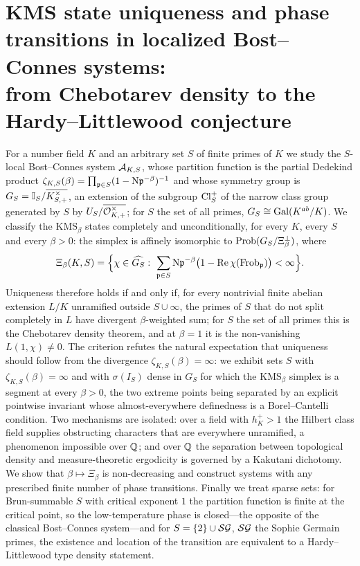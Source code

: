 \chapter[KMS uniqueness in localized Bost--Connes systems]{KMS state uniqueness and phase transitions in localized Bost--Connes systems:\\ from Chebotarev density to the Hardy--Littlewood conjecture}\label{ch:Main}
\begin{summary}
For a number field $K$ and an arbitrary set $S$ of finite primes of $K$ we
study the $S$-local Bost--Connes system $\mathcal{A}_{K,S}$, whose partition function
is the partial Dedekind product $\zeta_{K,S}(\beta)=\prod_{\mathfrak{p}\in S}(1-\mathrm{N}\mathfrak{p}^{-\beta})^{-1}$
and whose symmetry group is $G_S=\mathbb{I}_S/\overline{K^\times_{S,+}}$, an
extension of the subgroup $\operatorname{Cl}^+_S$ of the narrow class group generated by $S$
by $U_S/\overline{\mathcal{O}^\times_{K,+}}$; for $S$ the set of all primes,
$G_S\cong\operatorname{Gal}(K^{ab}/K)$. We classify the $\mathrm{KMS}_\beta$ states
completely and unconditionally, for every $K$, every $S$ and every $\beta>0$:
the simplex is affinely isomorphic to $\mathrm{Prob}(G_S/\Xi_\beta^\perp)$, where
\[
\Xi_\beta(K,S)=\Bigl\{\chi\in\widehat{G_S}:\ \sum_{\pp\in S}\Ns\pp^{-\beta}\bigl(1-\operatorname{Re}\chi(\Frob_\pp)\bigr)<\infty\Bigr\}.
\]
Uniqueness therefore holds if and only if, for every nontrivial finite abelian
extension $L/K$ unramified outside $S\cup\infty$, the primes of $S$ that do not
split completely in $L$ have divergent $\beta$-weighted sum; for $S$ the set of
all primes this is the Chebotarev density theorem, and at $\beta=1$ it is the
non-vanishing $L(1,\chi)\neq0$. The criterion refutes the natural
expectation that uniqueness should follow from the divergence
$\zeta_{K,S}(\beta)=\infty$: we exhibit sets $S$ with
$\zeta_{K,S}(\beta)=\infty$ and with $\sigma(I_S)$ dense in $G_S$ for which the
$\mathrm{KMS}_\beta$ simplex is a segment at every $\beta>0$, the two extreme
points being separated by an explicit pointwise invariant whose almost-everywhere
definedness is a Borel--Cantelli condition. Two mechanisms are isolated: over a
field with $h^+_K>1$ the Hilbert class field supplies obstructing characters
that are everywhere unramified, a phenomenon impossible over $\mathbb{Q}$; and over
$\mathbb{Q}$ the separation between topological density and measure-theoretic
ergodicity is governed by a Kakutani dichotomy. We show that $\beta\mapsto\Xi_\beta$
is non-decreasing and construct systems with any prescribed finite number of
phase transitions. Finally we treat sparse sets: for Brun-summable $S$ with
critical exponent $1$ the partition function is finite at the critical point,
so the low-temperature phase is closed---the opposite of the classical
Bost--Connes system---and for $S=\{2\}\cup\mathcal{SG}$, $\mathcal{SG}$ the Sophie Germain
primes, the existence and location of the transition are equivalent to a
Hardy--Littlewood type density statement.
\end{summary}


